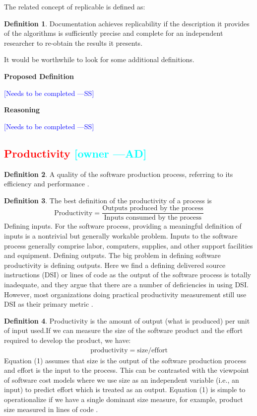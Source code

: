 \documentclass[letterpaper,cleveref]{lipics-v2019}
\newcommand{\authornote}[3]{\textcolor{#1}{[#3 ---#2]}}
\newcommand{\authornote}[3]{}
\newcommand{\wss}[1]{\authornote{blue}{SS}{#1}} %
\newcommand{\ad}[1]{\authornote{cyan}{AD}{#1}} %
\newcommand{\notdone}[1]{\textcolor{red}{#1}}
\theoremstyle{definition}
\newtheorem{defn}{Definition}
\begin{document}
The related concept of replicable is defined as:

\begin{defn}
Documentation achieves replicability if the description it provides of the
algorithms is sufficiently precise and complete for an independent researcher to
re-obtain the results it presents.  \citep{BenureauAndRougier2017}
\end{defn}

It would be worthwhile to look for some additional definitions.

\noindent \textbf{Proposed Definition} 

\wss{Needs to be completed}

\noindent \textbf{Reasoning}

\wss{Needs to be completed}

\subsection{\notdone{Productivity} \ad{owner}}

\begin{defn}
A quality of the software production process, referring to its efficiency and
performance \citep{ghezzi1991fundamentals}.
\end{defn}
\begin{defn}
The best definition of the productivity of a process is
\[\text{Productivity} = \dfrac{\text{Outputs produced by the
      process}}{\text{Inputs consumed by the process}}\] Defining inputs. For
the software process, providing a meaningful definition of inputs is a
nontrivial but generally workable problem. Inputs to the software process
generally comprise labor, computers, supplies, and other support facilities and
equipment. Defining outputs. The big problem in defining software productivity
is defining outputs. Here we find a defining delivered source instructions (DSI)
or lines of code as the output of the software process is totally inadequate,
and they argue that there are a number of deficiencies in using DSI. However,
most organizations doing practical productivity measurement still use DSI as
their primary metric \citep{Boehm1987}.
\end{defn}
\begin{defn}
\label{ProductivitySelected}
Productivity is the amount of output (what is produced) per unit of input
used.If we can measure the size of the software product and the effort required
to develop the product, we have:
\begin{align}
\text{productivity} = \text{size}/\text{effort}
\end{align}
Equation (1) assumes that size is the output of the software production process
and effort is the input to the process. This can be contrasted with the
viewpoint of software cost models where we use size as an independent variable
(i.e., an input) to predict effort which is treated as an output. Equation (1)
is simple to operationalize if we have a single dominant size measure, for
example, product size measured in lines of code \citep{Kitchenham2004}.
\end{defn}
\end{document}

